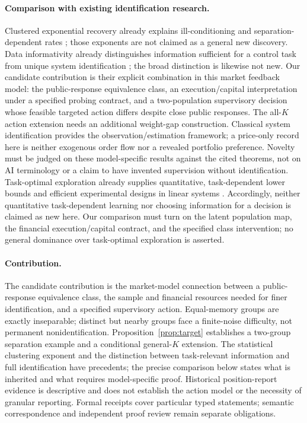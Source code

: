 \documentclass[12pt]{article}
\theoremstyle{definition}
\theoremstyle{remark}
\begin{document}
\paragraph{Comparison with existing identification research.}
Clustered exponential recovery already explains ill-conditioning and separation-dependent rates \citep{batenkov2021,katz2023}; those exponents are not claimed as a general new discovery. Data informativity already distinguishes information sufficient for a control task from unique system identification \citep{vanwaarde2020}; the broad distinction is likewise not new. Our candidate contribution is their explicit combination in this market feedback model: the public-response equivalence class, an execution/capital interpretation under a specified probing contract, and a two-population supervisory decision whose feasible targeted action differs despite close public responses. The all-$K$ action extension needs an additional weight-gap construction. Classical system identification \citep{ljung1999} provides the observation/estimation framework; a price-only record here is neither exogenous order flow nor a revealed portfolio preference. Novelty must be judged on these model-specific results against the cited theorems, not on AI terminology or a claim to have invented supervision without identification. Task-optimal exploration already supplies quantitative, task-dependent lower bounds and efficient experimental designs in linear systems \citep{wagenmaker2021}. Accordingly, neither quantitative task-dependent learning nor choosing information for a decision is claimed as new here. Our comparison must turn on the latent population map, the financial execution/capital contract, and the specified class intervention; no general dominance over task-optimal exploration is asserted.

\paragraph{Contribution.} The candidate contribution is the market-model connection between a public-response equivalence class, the sample and financial resources needed for finer identification, and a specified supervisory action. Equal-memory groups are exactly inseparable; distinct but nearby groups face a finite-noise difficulty, not permanent nonidentification. Proposition~\ref{prop:target} establishes a two-group separation example and a conditional general-$K$ extension. The statistical clustering exponent and the distinction between task-relevant information and full identification have precedents; the precise comparison below states what is inherited and what requires model-specific proof. Historical position-report evidence is descriptive and does not establish the action model or the necessity of granular reporting. Formal receipts cover particular typed statements; semantic correspondence and independent proof review remain separate obligations.
\end{document}
